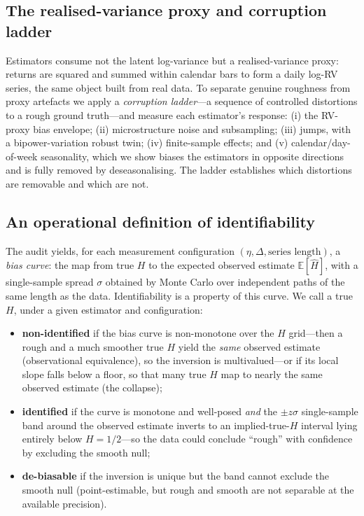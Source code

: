 \documentclass[11pt]{article}
\begin{document}
\subsection{The realised-variance proxy and corruption ladder}

Estimators consume not the latent log-variance but a realised-variance proxy:
returns are squared and summed within calendar bars to form a daily log-RV series,
the same object built from real data. To separate genuine roughness from proxy
artefacts we apply a \emph{corruption ladder}---a sequence of controlled distortions
to a rough ground truth---and measure each estimator's response: (i) the RV-proxy
bias envelope; (ii) microstructure noise and subsampling; (iii) jumps, with a
bipower-variation robust twin; (iv) finite-sample effects; and (v)
calendar/day-of-week seasonality, which we show biases the estimators in opposite
directions and is fully removed by deseasonalising. The ladder establishes which
distortions are removable and which are not.

\subsection{An operational definition of identifiability}
\label{sec:iddef}

The audit yields, for each measurement configuration $(\eta, \Delta, \text{series
length})$, a \emph{bias curve}: the map from true $H$ to the expected observed
estimate $\mathbb{E}[\hat H]$, with a single-sample spread $\sigma$ obtained by
Monte Carlo over independent paths of the same length as the data. Identifiability
is a property of this curve. We call a true $H$, under a given estimator and
configuration:
\begin{itemize}
\item \textbf{non-identified} if the bias curve is non-monotone over the $H$
grid---then a rough and a much smoother true $H$ yield the \emph{same} observed
estimate (observational equivalence), so the inversion is multivalued---or if its
local slope falls below a floor, so that many true $H$ map to nearly the same
observed estimate (the collapse);
\item \textbf{identified} if the curve is monotone and well-posed \emph{and} the
$\pm z\sigma$ single-sample band around the observed estimate inverts to an
implied-true-$H$ interval lying entirely below $H = 1/2$---so the data could
conclude ``rough'' with confidence by excluding the smooth null;
\item \textbf{de-biasable} if the inversion is unique but the band cannot exclude
the smooth null (point-estimable, but rough and smooth are not separable at the
available precision).
\end{itemize}
\end{document}
